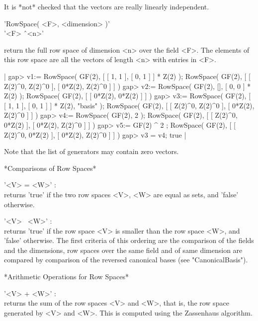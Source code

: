 It is *not* checked that the vectors are really linearly independent.

\vspace{5mm}

'RowSpace( <F>, <dimension> )' \\
'<F> \^\ <n>'

return the full row space of dimension <n> over the field <F>.
The elements of this row space are all the vectors of length <n> with entries
in <F>.

|    gap> v1:= RowSpace( GF(2), [ [ 1, 1 ], [ 0, 1 ] ] * Z(2) );
    RowSpace( GF(2), [ [ Z(2)^0, Z(2)^0 ], [ 0*Z(2), Z(2)^0 ] ] )
    gap> v2:= RowSpace( GF(2), [], [ 0, 0 ] * Z(2) );
    RowSpace( GF(2), [ [ 0*Z(2), 0*Z(2) ] ] )
    gap> v3:= RowSpace( GF(2), [ [ 1, 1 ], [ 0, 1 ] ] * Z(2), "basis" );
    RowSpace( GF(2), [ [ Z(2)^0, Z(2)^0 ], [ 0*Z(2), Z(2)^0 ] ] )
    gap> v4:= RowSpace( GF(2), 2 );
    RowSpace( GF(2), [ [ Z(2)^0, 0*Z(2) ], [ 0*Z(2), Z(2)^0 ] ] )
    gap> v5:= GF(2) ^ 2 ;
    RowSpace( GF(2), [ [ Z(2)^0, 0*Z(2) ], [ 0*Z(2), Z(2)^0 ] ] )
    gap> v3 = v4;
    true |

Note that the list of generators may contain zero vectors.


*Comparisons of Row Spaces*

'<V> = <W>' : \\
    returns 'true' if the two row spaces <V>, <W> are equal as sets,
    and 'false' otherwise.

'<V> \<\ <W>' : \\
    returns 'true' if the row space <V> is smaller than the row space <W>,
    and 'false' otherwise.  The first criteria of this ordering are the
    comparison of the fields and the dimensions, row spaces over the same
    field and of same dimension are compared by comparison of the
    reversed canonical bases (see "CanonicalBasis").
    
\vspace{5mm}

*Arithmetic Operations for Row Spaces*

'<V> + <W>' : \\
    returns the sum of the row spaces <V> and <W>, that is, the row space
    generated by <V> and <W>.  This is computed using the Zassenhaus
    algorithm.

